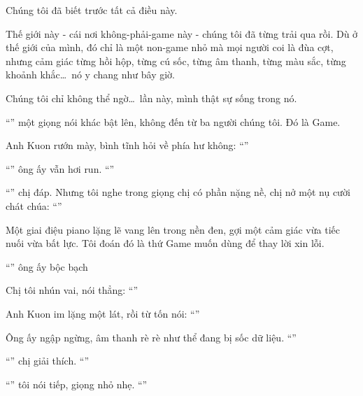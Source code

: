 \documentclass[../main.tex]{subfiles}
\begin{document}
Chúng tôi đã biết trước tất cả điều này.

Thế giới này - cái nơi không-phải-game này - chúng tôi đã từng trải qua rồi. Dù ở thế giới của mình, đó chỉ là một non-game nhỏ mà mọi người coi là đùa cợt, nhưng cảm giác từng hồi hộp, từng cú sốc, từng âm thanh, từng màu sắc, từng khoảnh khắc\dots\ nó y chang như bây giờ.

Chúng tôi chỉ không thể ngờ\dots\ lần này, mình thật sự sống trong nó.

``'' một giọng nói khác bật lên, không đến từ ba người chúng tôi. Đó là Game.

Anh Kuon rướn mày, bình tĩnh hỏi về phía hư không: ``''

``'' ông ấy vẫn hơi run. ``''

``'' chị đáp. Nhưng tôi nghe trong giọng chị có phần nặng nề, chị nở một nụ cười chát chúa: ``''

Một giai điệu piano lặng lẽ vang lên trong nền đen, gợi một cảm giác vừa tiếc nuối vừa bất lực. Tôi đoán  đó là thứ Game muốn dùng để thay lời xin lỗi.

``'' ông ấy bộc bạch

Chị tôi nhún vai, nói thẳng: ``''

Anh Kuon im lặng một lát, rồi từ tốn nói: ``''

Ông ấy ngập ngừng, âm thanh rè rè như thể đang bị sốc dữ liệu. ``''

``'' chị giải thích. ``''

``'' tôi nói tiếp, giọng nhỏ nhẹ. ``''
\end{document}
